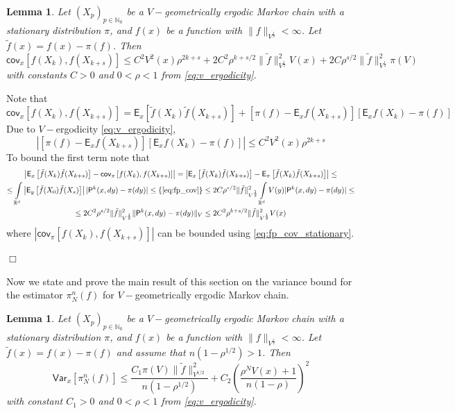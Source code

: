 \documentclass[bj]{imsart}
\def\P{\mathsf{P}}
\def\PE{\mathsf{E}}
\def\PVar{\mathsf{Var}}
\def\PCov{\mathsf{cov}}
\def\nset{\mathbb{N}}
\def\rset{\mathbb{R}}
\def\rset{\mathbb{R}}
\newcommand{\proofendsign}{$\Box$}
\newtheorem{lem}[thm]{Lemma}
\newenvironment{proof}{{\noindent \bf Proof }}
 {{\hspace*{\fill}\proofendsign\par\bigskip}}
\begin{document}
\begin{lem}
\label{lem:covariance}
Let $(X_p)_{p \in \nset_0}$ be a $V-$geometrically ergodic Markov chain with a stationary distribution $\pi$, and $f(x)$ be a function with $\|f\|_{V^{\frac{1}{2}}} < \infty$. Let $\tilde{f}(x) = f(x) - \pi(f)$. Then
\begin{equation}
\label{eq:cov_v_ergodic}
\PCov_x \left[f(X_k),f(X_{k+s})\right] \leq C^2V^2(x)\rho^{2k+s} + 2C^2\rho^{k+s/2}\|\tilde{f}\|^2_{V^{\frac{1}{2}}}V(x) + 2C\rho^{s/2}\|\tilde{f}\|^2_{V^{\frac{1}{2}}}\pi(V)
\end{equation}
with constants $C > 0$ and $0 < \rho < 1$ from \eqref{eq:v_ergodicity}.
\end{lem}
\begin{proof}
Note that
\[
\PCov_x \left[f(X_k),f(X_{k+s})\right] = \PE_x\left[\tilde{f}(X_{k})\tilde{f}(X_{k+s})\right] + \left[\pi(f) - \PE_xf(X_{k+s})\right]\left[\PE_xf(X_k) - \pi(f)\right]
\]
Due to $V-$ergodicity \eqref{eq:v_ergodicity},
\[
\left|\left[\pi(f) - \PE_xf(X_{k+s})\right]\left[\PE_xf(X_k) - \pi(f)\right]\right| \leq C^2V^2(x)\rho^{2k+s}
\]
To bound the first term note that
\begin{multline*}
\left|\PE_x\left[\tilde{f}(X_{k})\tilde{f}(X_{k+s})\right] - \PCov_{\pi}\left[f(X_k),f(X_{k+s})\right]\right| = \left|\PE_x\left[\tilde{f}(X_{k})\tilde{f}(X_{k+s})\right] - \PE_\pi\left[\tilde{f}(X_{k})\tilde{f}(X_{k+s})\right]\right| \leq
\\
\leq \int\limits_{\rset^d}\left|\PE_y\left[\tilde{f}(X_0)\tilde{f}(X_{s})\right]\right| |\P^k(x,dy)-\pi(dy)|
\leq \{\eqref{eq:fp_cov}\}\leq 2C\rho^{s/2}\|\tilde{f}\|^2_{V^{\frac{1}{2}}}\int\limits_{\rset^d} V(y) |\P^k(x,dy)-\pi(dy)| \leq 
\\
\leq 2C^2\rho^{s/2}\|\tilde{f}\|^2_{V^{\frac{1}{2}}}\|\P^k(x,dy)-\pi(dy)\|_{V} \leq 2C^2\rho^{k+s/2}\|\tilde{f}\|^2_{V^{\frac{1}{2}}}V(x)
\end{multline*}
where $\left|\PCov_{\pi}\left[f(X_k),f(X_{k+s})\right]\right|$ can be bounded using \eqref{eq:fp_cov_stationary}. 
\end{proof}
Now we state and prove the main result of this section on the variance bound for the estimator $\pi_N^n(f)$ for $V-$geometrically ergodic Markov chain.
\begin{lem}
\label{lem:var_bound}
Let $(X_p)_{p \in \nset_0}$ be a $V-$geometrically ergodic Markov chain with a stationary distribution $\pi$, and $f(x)$ be a function with $\|f\|_{V^{\frac{1}{2}}} < \infty$. Let $\tilde{f}(x) = f(x) - \pi(f)$ and assume that $n(1-\rho^{1/2}) > 1$. Then
\begin{equation}
\label{eq:vanilla_var}
\PVar_x \left[ \pi_{N}^n(f) \right] \leq \frac{C_1\pi(V)\|\tilde{f}\|^2_{V^{1/2}}}{n(1-\rho^{1/2})} + C_2\left(\frac{\rho^NV(x) + 1}{n(1-\rho)}\right)^2
\end{equation}
with constant $C_1 > 0$ and $0 < \rho <1$ from \eqref{eq:v_ergodicity}.
\end{lem}
\end{document}
